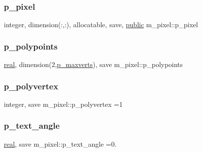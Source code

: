 \mbox{\label{namespacem__pixel_abdde5773f7569de72bb28d6818a44914}} 
\subsubsection{\texorpdfstring{p\+\_\+pixel}{p\_pixel}}
{\footnotesize\ttfamily integer, dimension(\+:,\+:), allocatable, save, \hyperlink{M__stopwatch_83_8txt_a2f74811300c361e53b430611a7d1769f}{public} m\+\_\+pixel\+::p\+\_\+pixel}

\mbox{\label{namespacem__pixel_ab5c7f104a86e11630f363a26a1cb7067}} 
\subsubsection{\texorpdfstring{p\+\_\+polypoints}{p\_polypoints}}
{\footnotesize\ttfamily \hyperlink{read__watch_83_8txt_abdb62bde002f38ef75f810d3a905a823}{real}, dimension(2,\hyperlink{namespacem__pixel_ac1b53fdfda87eb9ede10e72973344e25}{p\+\_\+maxverts}), save m\+\_\+pixel\+::p\+\_\+polypoints\hspace{0.3cm}{\ttfamily [private]}}

\mbox{\label{namespacem__pixel_ac0759567a2205be55bc4c9b8b7b6d5d5}} 
\subsubsection{\texorpdfstring{p\+\_\+polyvertex}{p\_polyvertex}}
{\footnotesize\ttfamily integer, save m\+\_\+pixel\+::p\+\_\+polyvertex =1\hspace{0.3cm}{\ttfamily [private]}}

\mbox{\label{namespacem__pixel_a3b1c231e0814986c5d095cbd4297c816}} 
\subsubsection{\texorpdfstring{p\+\_\+text\+\_\+angle}{p\_text\_angle}}
{\footnotesize\ttfamily \hyperlink{read__watch_83_8txt_abdb62bde002f38ef75f810d3a905a823}{real}, save m\+\_\+pixel\+::p\+\_\+text\+\_\+angle =0.\hspace{0.3cm}{\ttfamily [private]}}

